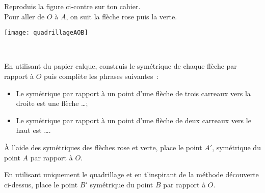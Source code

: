 


\begin{activite}

\begin{minipage}[c]{0.67\linewidth}
\begin{partie}
Reproduis la figure ci-contre sur ton cahier. \\[0.5em]
Pour aller de $O$ à $A$, on suit la flèche rose puis la verte.
\end{partie}
 \end{minipage}
  \qquad \begin{minipage}[c]{0.36\linewidth}
  \texttt{[image: quadrillageAOB]}
  \end{minipage} \\

\begin{partie}
En utilisant du papier calque, construis le symétrique de chaque flèche par rapport à $O$ puis complète les phrases suivantes : 
\begin{itemize}
 \item Le symétrique par rapport à un point d'une flèche de trois carreaux vers la droite est une flèche \ldots ;
 \item Le symétrique par rapport à un point d'une flèche de deux carreaux vers le haut est \ldots.
 \end{itemize}
\end{partie}
                
\begin{partie}
À l'aide des symétriques des flèches rose et verte, place le point $A'$, symétrique du point $A$ par rapport à $O$.
\end{partie}
         
\begin{partie}
En utilisant uniquement le quadrillage et en t'inspirant de la méthode découverte ci-dessus, place le point $B'$ symétrique du point $B$ par rapport à $O$.
\end{partie}

\end{activite}


